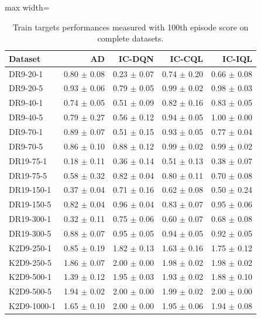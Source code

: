 \documentclass{article}
\begin{document}
\begin{table}[ht]
    \label{tab:}
    \begin{center}
    \caption{Train targets performances measured with 100th episode score on complete datasets.}
    \begin{small}
    \begin{adjustbox}{max width=\columnwidth}
		\begin{tabular}{l|rrrr}
		\toprule
	\textbf{Dataset} & \textbf{AD} & \textbf{IC-DQN} & \textbf{IC-CQL} & \textbf{IC-IQL}\\
\midrule
DR9-20-1 & 0.80 $\pm$ 0.08 & 0.23 $\pm$ 0.07 & 0.74 $\pm$ 0.20 & 0.66 $\pm$ 0.08\\
DR9-20-5 & 0.93 $\pm$ 0.06 & 0.79 $\pm$ 0.05 & 0.99 $\pm$ 0.02 & 0.98 $\pm$ 0.03\\
DR9-40-1 & 0.74 $\pm$ 0.05 & 0.51 $\pm$ 0.09 & 0.82 $\pm$ 0.16 & 0.83 $\pm$ 0.05\\
DR9-40-5 & 0.79 $\pm$ 0.27 & 0.56 $\pm$ 0.12 & 0.94 $\pm$ 0.05 & 1.00 $\pm$ 0.00\\
DR9-70-1 & 0.89 $\pm$ 0.07 & 0.51 $\pm$ 0.15 & 0.93 $\pm$ 0.05 & 0.77 $\pm$ 0.04\\
DR9-70-5 & 0.86 $\pm$ 0.10 & 0.88 $\pm$ 0.12 & 0.99 $\pm$ 0.02 & 0.99 $\pm$ 0.02\\
DR19-75-1 & 0.18 $\pm$ 0.11 & 0.36 $\pm$ 0.14 & 0.51 $\pm$ 0.13 & 0.38 $\pm$ 0.07\\
DR19-75-5 & 0.58 $\pm$ 0.32 & 0.82 $\pm$ 0.04 & 0.80 $\pm$ 0.11 & 0.70 $\pm$ 0.08\\
DR19-150-1 & 0.37 $\pm$ 0.04 & 0.71 $\pm$ 0.16 & 0.62 $\pm$ 0.08 & 0.50 $\pm$ 0.24\\
DR19-150-5 & 0.82 $\pm$ 0.04 & 0.96 $\pm$ 0.04 & 0.83 $\pm$ 0.07 & 0.95 $\pm$ 0.06\\
DR19-300-1 & 0.32 $\pm$ 0.11 & 0.75 $\pm$ 0.06 & 0.60 $\pm$ 0.07 & 0.68 $\pm$ 0.08\\
DR19-300-5 & 0.88 $\pm$ 0.07 & 0.95 $\pm$ 0.05 & 0.94 $\pm$ 0.05 & 0.92 $\pm$ 0.05\\
K2D9-250-1 & 0.85 $\pm$ 0.19 & 1.82 $\pm$ 0.13 & 1.63 $\pm$ 0.16 & 1.75 $\pm$ 0.12\\
K2D9-250-5 & 1.86 $\pm$ 0.07 & 2.00 $\pm$ 0.00 & 1.98 $\pm$ 0.02 & 1.98 $\pm$ 0.02\\
K2D9-500-1 & 1.39 $\pm$ 0.12 & 1.95 $\pm$ 0.03 & 1.93 $\pm$ 0.02 & 1.88 $\pm$ 0.10\\
K2D9-500-5 & 1.94 $\pm$ 0.02 & 2.00 $\pm$ 0.00 & 1.99 $\pm$ 0.02 & 2.00 $\pm$ 0.00\\
K2D9-1000-1 & 1.65 $\pm$ 0.10 & 2.00 $\pm$ 0.00 & 1.95 $\pm$ 0.06 & 1.94 $\pm$ 0.08\\

\end{tabular}
\end{adjustbox}
\end{small}
\end{center}
\end{table}
\end{document}
